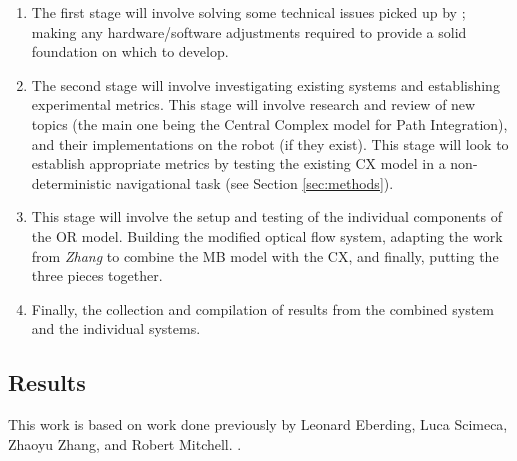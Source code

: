 \documentclass[a4paper,11pt,twoside,openright]{article}
\begin{document}
\begin{enumerate}
\item{The first stage will involve solving some technical issues
  picked up by \cite{Mitchell2018}; making any hardware/software adjustments
  required to provide a solid foundation on which to develop.}

\item{ The second stage
will involve investigating existing systems and establishing experimental
metrics. This stage will involve research and review of new topics (the
main one being the Central Complex model for Path Integration), and their
implementations on the robot (if they exist). This stage will look to establish
appropriate metrics by testing the existing CX model in a non-deterministic
navigational task (see Section \ref{sec:methods}).}

\item{This stage will involve the setup and testing of the individual components
  of the OR model. Building the modified optical flow system, adapting the work
  from \textit{Zhang} to combine the MB model with the CX, and finally, putting
  the three pieces together.}

\item{Finally, the collection and compilation of results from the combined system
and the individual systems.}
\end{enumerate}


\subsection { Results }
This work is based on work done previously by Leonard Eberding, Luca Scimeca,
Zhaoyu Zhang, and Robert Mitchell.
\cite{Eberding2016, Scimeca2017, Zhang2017, Mitchell2018}.
\newline
\end{document}

